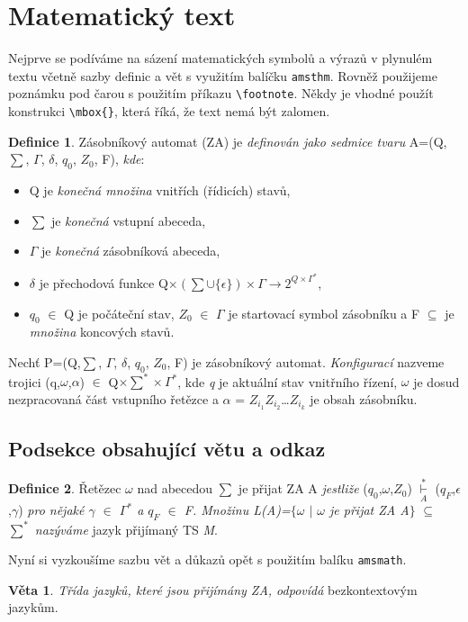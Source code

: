 \documentclass[11pt,a4paper,twocolumn]{article}
\theoremstyle{definition}
\newtheorem{definition}{Definice}[]
\newtheorem{sentence}{Věta}[]
\begin{document}
\section{Matematický text}
    Nejprve se podíváme na sázení matematických symbolů a výrazů v plynulém textu včetně sazby definic a vět s využitím balíčku \texttt{amsthm}. Rovněž použijeme poznámku pod čarou s použitím příkazu \verb|\footnote|. Někdy je vhodné použít konstrukci \verb|\mbox{}|, která říká, že text nemá být zalomen.
    \begin{definition}
        \label{definice1}
         Zásobníkový automat (ZA) je \emph{definován jako sedmice tvaru} A=(Q,$\scriptstyle\sum$, $\Gamma$, $\delta$, $q_0$, $Z_0$, F), \emph{kde}:
         \begin{itemize}
           \item Q je \emph{konečná množina} vnitřích (řídicích) stavů,
           \item $\sum$ je \emph{konečná} vstupní abeceda,
           \item $\Gamma$ je \emph{konečná} zásobníková abeceda,
           \item $\delta$ je přechodová funkce Q$\times(\scriptstyle\sum\cup\{\epsilon\})\times\Gamma \rightarrow 2^{{Q \times\Gamma}^{\ast}}$,
           \item $q_0$ $\in$ Q je počáteční stav, $Z_0$ $\in$ $\Gamma$ je startovací symbol zásobníku a F $\subseteq$ je \emph{množina} koncových stavů.
         \end{itemize}\par
    \end{definition}
    Nechť P=(Q,$\scriptstyle\sum$, $\Gamma$, $\delta$, $q_0$, $Z_0$, F) je zásobníkový automat. \emph{Konfigurací} nazveme trojici (q,$\omega$,$\alpha$) $\in$ Q$\times\scriptstyle\sum^{\ast}\times\Gamma^{\ast}$, kde \emph{q} je aktuální stav vnitřního řízení, $\omega$ je dosud nezpracovaná část vstupního řetězce a $\alpha$ = $Z_{i_1}Z_{i_2}$\dots$Z_{i_k}$ je obsah zásobníku\footnotemark.

    \subsection{Podsekce obsahující větu a odkaz}
        \begin{definition}
            \label{definition2}
            Řetězec $\omega$ nad abecedou $\scriptstyle\sum$ je přijat ZA A \emph{jestliže} ($q_0$,$\omega$,$Z_0$) $\overset{\ast}{\underset{A}{\vdash}}$ ($q_F$,$\epsilon$,$\gamma$) \emph{pro nějaké $\gamma$ $\in$ $\Gamma^\ast$ a $q_F$ $\in$ F. Množinu L(A)=$\{\omega$ $|$ $\omega$ je přijat ZA A$\}$} $\subseteq$ $\scriptstyle\sum^\ast$ \emph{nazýváme} jazyk přijímaný TS \emph{M}.
        \end{definition}
        Nyní si vyzkoušíme sazbu vět a důkazů opět s použitím balíku \texttt{amsmath}.
        \begin{sentence}
            \label{sentence}
            \emph{Třída jazyků, které jsou přijímány ZA, odpovídá} bezkontextovým jazykům.
        \end{sentence}
\end{document}
